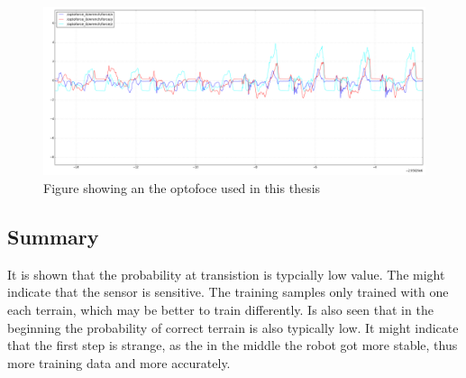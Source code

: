 \documentclass[USenglish]{ifimaster}  %
\begin{document}
\begin{figure}[h]
    \centering
    \includegraphics[width=\textwidth,height=\textheight,keepaspectratio]{Figures/MM4Teppe2}
    \caption{Figure showing an the optofoce used in this thesis \cite{OptoforceFig}}
    \label{fig:optoforce}
\end{figure}

\begin{table}[h]
\centering
{}
\caption{MM4 Teppe}
\label{my-label}
\end{table}
\FloatBarrier
\subsection{Summary}
It is shown that the probability at transistion is typcially low value. The might indicate that the sensor is sensitive. The training samples only trained with one each terrain, which may be better to train differently. Is also seen that in the beginning the probability of correct terrain is also typically low. It might indicate that the first step is strange, as the in the middle the robot got more stable, thus more training data and more accurately. 
\end{document}
